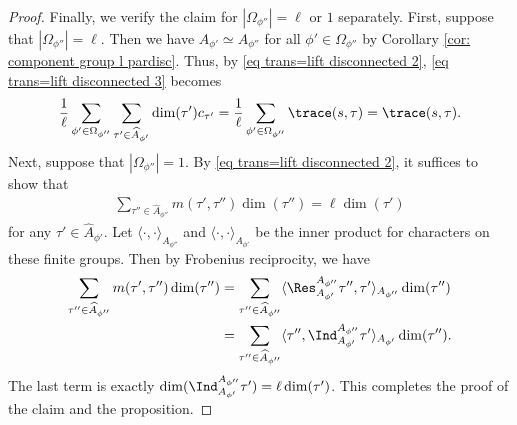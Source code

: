 \documentclass[11pt,letterpaper]{amsart}
\numberwithin{equation}{section}
\begin{document}
\begin{proof}
   
  Finally, we verify the claim for $|\Omega_{\phi''}|=\ell$ or $1$ separately. First, suppose that $|\Omega_{\phi''}|=\ell$. Then we have $A_{\phi'}\simeq A_{\phi''}$ for all $\phi' \in \Omega_{\phi''}$ by Corollary \ref{cor: component group  l pardisc}. Thus, by \eqref{eq trans=lift disconnected 2},  \eqref{eq trans=lift disconnected 3} becomes
   \[ \frac{1}{\ell}\sum_{\phi'\in \Omega_{\phi''}} \sum_{\tau' \in \widehat{A}_{\phi'}} \dim(\tau')  c_{\tau'}= \frac{1}{\ell}\sum_{\phi'\in \Omega_{\phi''}} \trace(s,\tau)= \trace(s,\tau). \]
   Next, suppose that $|\Omega_{\phi''}|=1$. By \eqref{eq trans=lift disconnected 2}, it suffices to show that 
   \begin{align*}
       \sum_{\tau'' \in \widehat{A}_{\phi''}}  m(\tau',\tau'') \dim(\tau'') = \ell \dim(\tau')
   \end{align*}
    for any $\tau' \in \widehat{A}_{\phi'}$. Let $\langle \cdot, \cdot \rangle_{A_{\phi''}}$ and $\langle \cdot, \cdot \rangle_{A_{\phi'}}$ be the inner product for characters on these finite groups. Then by Frobenius reciprocity, we have
    \begin{align*}
        \sum_{\tau'' \in \widehat{A}_{\phi''}}  m(\tau',\tau'') \dim(\tau'') 
        &= \sum_{\tau'' \in \widehat{A}_{\phi''}}  \langle \Res_{A_{\phi'}}^{A_{\phi''}}\tau'', \tau' \rangle_{A_{\phi''}} \dim(\tau'') \\
        & = \sum_{\tau'' \in \widehat{A}_{\phi''}}  \langle \tau'', \Ind_{A_{\phi'}}^{A_{\phi''}}\tau' \rangle_{A_{\phi'}} \dim(\tau'').
    \end{align*}
    The last term is exactly $\dim(\Ind_{A_{\phi'}}^{A_{\phi''}}\tau')= \ell \dim(\tau')$.
    This completes the proof of the claim and the proposition.
\end{proof}
\end{document}
